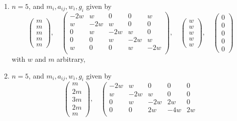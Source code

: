 \begin{lemma}
\begin{enumerate}
$$\begin{matrix}
w
\end{matrix}
\right),
\quad
\left(
\begin{matrix}
0 \\
0 \\
0 \\
0
\end{matrix}
\right)
$$
with $w$ and $m$ arbitrary,
\item
\label{item-five-cycle}
$n = 5$, and $m_i, a_{ij}, w_i, g_i$ given by
$$
\left(
\begin{matrix}
m \\
m \\
m \\
m \\
m
\end{matrix}
\right),
\quad
\left(
\begin{matrix}
-2w & w & 0 & 0 & w \\
w & -2w & w & 0 & 0 \\
0 & w & -2w & w & 0 \\
0 & 0 & w & -2w & w \\
w & 0 & 0 & w & -2w \\
\end{matrix}
\right),
\quad
\left(
\begin{matrix}
w \\
w \\
w \\
w \\
w
\end{matrix}
\right),
\quad
\left(
\begin{matrix}
0 \\
0 \\
0 \\
0 \\
0
\end{matrix}
\right)
$$
with $w$ and $m$ arbitrary,
\item
\label{item-equal-equal-up-equal}
$n = 5$, and $m_i, a_{ij}, w_i, g_i$ given by
$$
\left(
\begin{matrix}
m \\
2m \\
3m \\
2m \\
m
\end{matrix}
\right),
\quad
\left(
\begin{matrix}
-2w & w & 0 & 0 & 0 \\
w & -2w & w & 0 & 0 \\
0 & w & -2w & 2w & 0 \\
0 & 0 & 2w & -4w & 2w \\

\end{matrix}$$
\end{enumerate}
\end{lemma}
